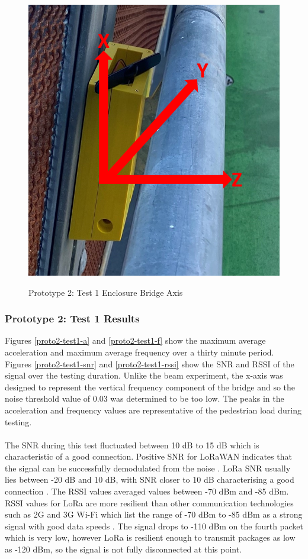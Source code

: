 \begin{figure}[H]
	\centering
	\caption{Prototype 2: Test 1 Enclosure Bridge Axis}
	\includegraphics[width=.7\textwidth]{Sections/Prototype-Testing/bridge-axis.png}
	\label{bridge-axis}
\end{figure}

\subsubsection{Prototype 2: Test 1 Results}
Figures \ref{proto2-test1-a} and \ref{proto2-test1-f} show the maximum average acceleration and maximum average frequency over a thirty minute period. Figures \ref{proto2-test1-snr} and \ref{proto2-test1-rssi} show the SNR and RSSI of the signal over the testing duration. Unlike the beam experiment, the x-axis was designed to represent the vertical frequency component of the bridge and so the noise threshold value of 0.03 was determined to be too low. The peaks in the acceleration and frequency values are representative of the pedestrian load during testing.\\\\ The SNR during this test fluctuated between 10 dB to 15 dB which is characteristic of a good connection. Positive SNR for LoRaWAN indicates that the signal can be successfully demodulated from the noise \cite{TNN-SNR-RSSI}. LoRa SNR usually lies between -20 dB and 10 dB, with SNR closer to 10 dB characterising a good connection \cite{LoRa-SNR-RSSI}. The RSSI values  averaged values between -70 dBm and -85 dBm. RSSI values for LoRa are more resilient than other communication technologies such as 2G and 3G Wi-Fi which 
list the range of -70 dBm to -85 dBm as a strong signal with good data speeds \cite{WIFI-RSSI}. The signal drops to -110 dBm on the fourth packet which is very low, however LoRa is resilient enough to transmit packages as low as -120 dBm, so the signal is not fully disconnected at this point. 

